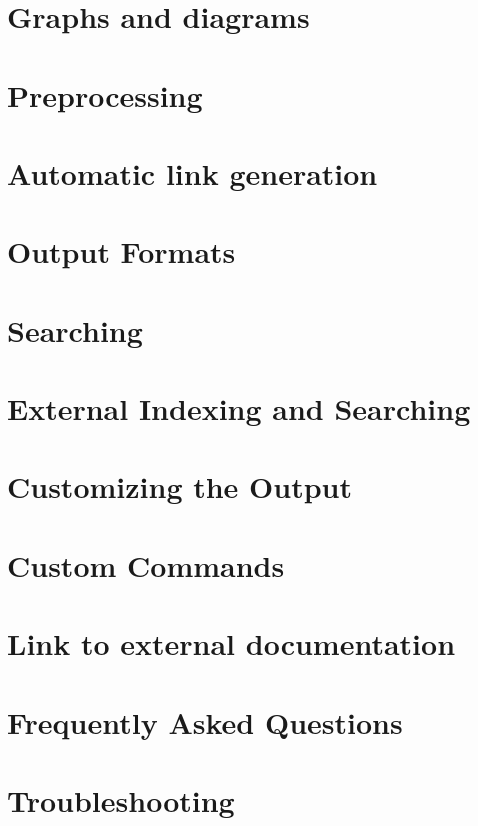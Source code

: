 \documentclass{book}
\begin{document}
\chapter{Graphs and diagrams}\label{diagrams}\hypertarget{diagrams}{}
\chapter{Preprocessing}\label{preprocessing}\hypertarget{preprocessing}{}
\chapter{Automatic link generation}\label{autolink}\hypertarget{autolink}{}
\chapter{Output Formats}\label{output}\hypertarget{output}{}
\chapter{Searching}\label{searching}\hypertarget{searching}{}
\chapter{External Indexing and Searching}\label{extsearch}\hypertarget{extsearch}{}
\chapter{Customizing the Output}\label{customize}\hypertarget{customize}{}
\chapter{Custom Commands}\label{custcmd}\hypertarget{custcmd}{}
\chapter{Link to external documentation}\label{external}\hypertarget{external}{}
\chapter{Frequently Asked Questions}\label{faq}\hypertarget{faq}{}
\chapter{Troubleshooting}\label{trouble}\hypertarget{trouble}{}
\end{document}
